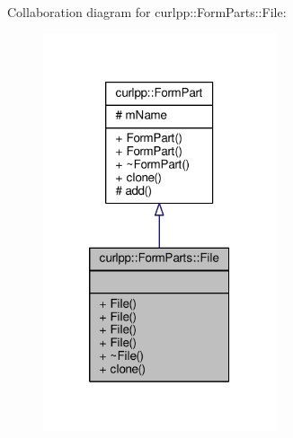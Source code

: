 Collaboration diagram for curlpp\-:\-:Form\-Parts\-:\-:File\-:
\nopagebreak
\begin{figure}[H]
\begin{center}
\leavevmode
\includegraphics[width=194pt]{classcurlpp_1_1FormParts_1_1File__coll__graph}
\end{center}
\end{figure}
